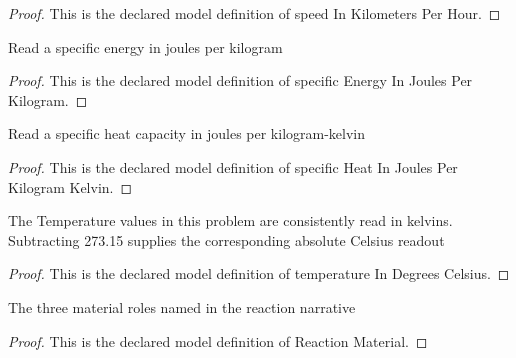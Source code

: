 \begin{proof}
  This is the declared model definition of speed In Kilometers Per Hour.
\end{proof}
\begin{definition}
  \label{def:physics:phyx-mini-0332:phyxminiproblems-problemphyxmini0332-specificenergyinjoulesperkilogram}
  Read a specific energy in joules per kilogram
\end{definition}
\begin{proof}
  This is the declared model definition of specific Energy In Joules Per Kilogram.
\end{proof}
\begin{definition}
  \label{def:physics:phyx-mini-0332:phyxminiproblems-problemphyxmini0332-specificheatinjoulesperkilogramkelvin}
  Read a specific heat capacity in joules per kilogram-kelvin
\end{definition}
\begin{proof}
  This is the declared model definition of specific Heat In Joules Per Kilogram Kelvin.
\end{proof}
\begin{definition}
  \label{def:physics:phyx-mini-0332:phyxminiproblems-problemphyxmini0332-temperatureindegreescelsius}
  The Temperature values in this problem are consistently read in kelvins. Subtracting 273.15 supplies the corresponding absolute Celsius readout
\end{definition}
\begin{proof}
  This is the declared model definition of temperature In Degrees Celsius.
\end{proof}
\begin{definition}
  \label{def:physics:phyx-mini-0332:phyxminiproblems-problemphyxmini0332-reactionmaterial}
  The three material roles named in the reaction narrative
\end{definition}
\begin{proof}
  This is the declared model definition of Reaction Material.
\end{proof}
